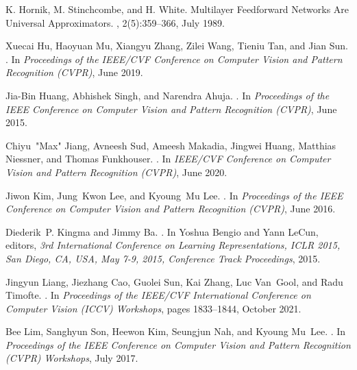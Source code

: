 \documentclass[10pt,twocolumn,letterpaper]{article}
\begin{document}
{\begin{thebibliography}{10}
K. Hornik, M. Stinchcombe, and H. White.
\newblock Multilayer {F}eedforward {N}etworks {A}re {U}niversal
  {A}pproximators.
, 2(5):359–366, July 1989.

Xuecai Hu, Haoyuan Mu, Xiangyu Zhang, Zilei Wang, Tieniu Tan, and Jian Sun.
.
\newblock In {\em Proceedings of the IEEE/CVF Conference on Computer Vision and
  Pattern Recognition (CVPR)}, June 2019.

Jia-Bin Huang, Abhishek Singh, and Narendra Ahuja.
.
\newblock In {\em Proceedings of the IEEE Conference on Computer Vision and
  Pattern Recognition (CVPR)}, June 2015.

Chiyu~"Max" Jiang, Avneesh Sud, Ameesh Makadia, Jingwei Huang, Matthias
  Niessner, and Thomas Funkhouser.
.
\newblock In {\em IEEE/CVF Conference on Computer Vision and Pattern
  Recognition (CVPR)}, June 2020.

Jiwon Kim, Jung~Kwon Lee, and Kyoung~Mu Lee.
.
\newblock In {\em Proceedings of the IEEE Conference on Computer Vision and
  Pattern Recognition (CVPR)}, June 2016.

Diederik~P. Kingma and Jimmy Ba.
.
\newblock In Yoshua Bengio and Yann LeCun, editors, {\em 3rd International
  Conference on Learning Representations, {ICLR} 2015, San Diego, CA, USA, May
  7-9, 2015, Conference Track Proceedings}, 2015.

Jingyun Liang, Jiezhang Cao, Guolei Sun, Kai Zhang, Luc Van~Gool, and Radu
  Timofte.
.
\newblock In {\em Proceedings of the IEEE/CVF International Conference on
  Computer Vision (ICCV) Workshops}, pages 1833--1844, October 2021.

Bee Lim, Sanghyun Son, Heewon Kim, Seungjun Nah, and Kyoung Mu~Lee.
.
\newblock In {\em Proceedings of the IEEE Conference on Computer Vision and
  Pattern Recognition (CVPR) Workshops}, July 2017.


\end{thebibliography}}
\end{document}
